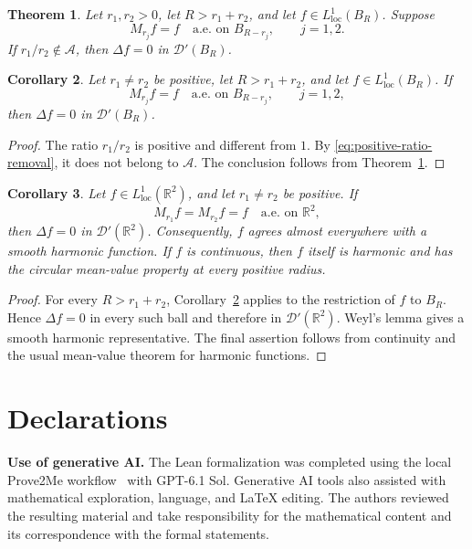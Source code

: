\documentclass[11pt]{amsart}
\numberwithin{equation}{section}
\newtheorem{theorem}{Theorem}[section]
\newtheorem{corollary}[theorem]{Corollary}
\theoremstyle{definition}
\theoremstyle{remark}
\newcommand{\R}{\mathbb R}
\newcommand{\D}{\mathcal D}
\begin{document}
\begin{theorem}\label{thm:Volchkov-local}
Let $r_1,r_2>0$, let $R>r_1+r_2$, and let
$f\in L^1_{\mathrm{loc}}(B_R)$.  Suppose
\[
   M_{r_j}f=f\quad\text{a.e. on }B_{R-r_j},
   \qquad j=1,2.
\]
If $r_1/r_2\notin\mathcal A$, then $\Delta f=0$ in $\D'(B_R)$.
\end{theorem}

\begin{corollary}
\label{cor:local-two-radius}
Let $r_1\ne r_2$ be positive, let $R>r_1+r_2$, and let
$f\in L^1_{\mathrm{loc}}(B_R)$.  If
\[
   M_{r_j}f=f\quad\text{a.e. on }B_{R-r_j},
   \qquad j=1,2,
\]
then $\Delta f=0$ in $\D'(B_R)$.
\end{corollary}

\begin{proof}
The ratio $r_1/r_2$ is positive and different from $1$.  By
\eqref{eq:positive-ratio-removal}, it does not belong to $\mathcal A$.
The conclusion follows from Theorem~\ref{thm:Volchkov-local}.
\end{proof}

\begin{corollary}
\label{cor:global-two-radius}
Let $f\in L^1_{\mathrm{loc}}(\R^2)$, and let $r_1\ne r_2$ be positive.  If
\[
   M_{r_1}f=M_{r_2}f=f\quad\text{a.e. on }\R^2,
\]
then $\Delta f=0$ in $\D'(\R^2)$.  Consequently, $f$ agrees almost
everywhere with a smooth harmonic function.  If $f$ is continuous, then
$f$ itself is harmonic and has the circular mean-value property at every
positive radius.
\end{corollary}

\begin{proof}
For every $R>r_1+r_2$, Corollary~\ref{cor:local-two-radius} applies to the
restriction of $f$ to $B_R$.  Hence $\Delta f=0$ in every such ball and
therefore in $\D'(\R^2)$.  Weyl's lemma gives a smooth harmonic
representative.  The final assertion follows from continuity and the usual
mean-value theorem for harmonic functions.
\end{proof}

\section*{Declarations}

\noindent\textbf{Use of generative AI.}
The Lean formalization was completed using the local Prove2Me
workflow~\cite{Prove2Me} with GPT-6.1 Sol. Generative AI tools also
assisted with mathematical exploration, language, and \LaTeX{} editing.
The authors reviewed the resulting material and take responsibility for
the mathematical content and its correspondence with the formal statements.
\end{document}
